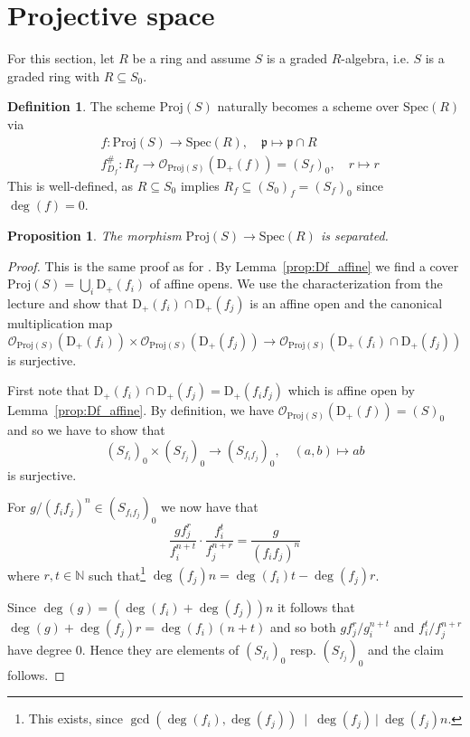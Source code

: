 \documentclass{scrartcl}
\newcommand{\N}{\mathbb{N}}
\newcommand{\D}[1]{\mathrm{D}_+(#1)}
\newcommand{\p}{\mathfrak{p}}
\newcommand{\Spec}{\mathrm{Spec}}
\newcommand{\Proj}{\mathrm{Proj}}
\renewcommand{\O}{\mathcal{O}}
\newcommand{\citestacks}[1]{\cite[\href{https://stacks.math.columbia.edu/tag/#1}{Tag #1}]{stacks}}
\newtheorem{prop}[subsection]{Proposition}
\theoremstyle{definition}
\newtheorem{definition}[subsection]{Definition}
\begin{document}
\section{Projective space}
For this section, let $R$ be a ring and assume $S$ is a graded $R$-algebra, i.e. $S$ is a graded ring with $R \subseteq S_0$.
\begin{definition}
    The scheme $\Proj(S)$ naturally becomes a scheme over $\Spec(R)$ via
    \begin{align*}
        &f: \Proj(S) \to \Spec(R), \quad \p \mapsto \p \cap R \\
        &f^\#_{D_f}: R_f \to \O_{\Proj(S)}(\D{f}) = (S_f)_0, \quad r \mapsto r
    \end{align*}
    This is well-defined, as $R \subseteq S_0$ implies $R_f \subseteq (S_0)_f = (S_f)_0$ since $\deg(f) = 0$.
\end{definition}
\begin{prop}
    \label{prop:projective_space_separated}
    The morphism $\Proj(S) \to \Spec(R)$ is separated.
\end{prop}
\begin{proof}
    This is the same proof as for \citestacks{01MC}.
    By Lemma~\ref{prop:Df_affine} we find a cover $\Proj(S) = \bigcup_i \D{f_i}$ of affine opens.
    We use the characterization from the lecture and show that $\D{f_i} \cap \D{f_j}$ is an affine open and the canonical multiplication map
    \begin{equation*}
        \O_{\Proj(S)}(\D{f_i}) \times \O_{\Proj(S)}(\D{f_j}) \to \O_{\Proj(S)}(\D{f_i} \cap \D{f_j})
    \end{equation*}
    is surjective.
    
    First note that $\D{f_i} \cap \D{f_j} = \D{f_if_j}$ which is affine open by Lemma~\ref{prop:Df_affine}.
    By definition, we have $\O_{\Proj(S)}(\D{f}) = (S)_0$ and so we have to show that
    \begin{equation*}
        (S_{f_i})_0 \times (S_{f_j})_0 \to (S_{f_if_j})_0, \quad (a, b) \mapsto ab
    \end{equation*}
    is surjective.

    For $g/(f_if_j)^n \in (S_{f_if_j})_0$ we now have that
    \begin{equation*}
        \frac {gf_j^r} {f_i^{n + t}} \cdot \frac {f_i^t} {f_j^{n + r}} = \frac g {(f_if_j)^n}
    \end{equation*}
    where $r, t \in \N$ such that\footnote{This exists, since $\gcd(\deg(f_i), \deg(f_j)) \ \mid \ \deg(f_j) \ | \ \deg(f_j)n$.} $\deg(f_j) n = \deg(f_i) t - \deg(f_j) r$.

    Since $\deg(g) = (\deg(f_i) + \deg(f_j)) n$ it follows that $\deg(g) + \deg(f_j)r = \deg(f_i) (n + t)$ and so both $gf_j^r/g_i^{n + t}$ and $f_i^t/f_j^{n + r}$ have degree 0.
    Hence they are elements of $(S_{f_i})_0$ resp. $(S_{f_j})_0$ and the claim follows.
\end{proof}
\end{document}
